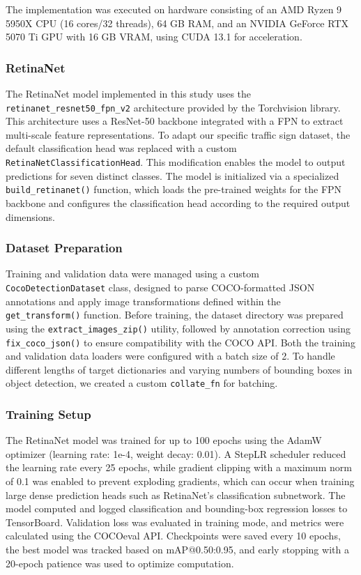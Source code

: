 \documentclass{article}
\begin{document}
The implementation was executed on hardware consisting of an AMD Ryzen 9 5950X CPU (16 cores/32 threads), 64 GB RAM, and an NVIDIA GeForce RTX 5070 Ti GPU with 16 GB VRAM, using CUDA 13.1 for acceleration.

\subsubsection{RetinaNet}
The RetinaNet model implemented in this study uses the \texttt{retinanet\_resnet50\_fpn\_v2} architecture provided by the Torchvision library. This architecture uses a ResNet-50 backbone integrated with a FPN to extract multi-scale feature representations. To adapt our specific traffic sign dataset,  the default classification head was replaced with a custom \texttt{RetinaNetClassificationHead}. This modification enables the model to output predictions for seven distinct classes. The model is initialized via a specialized \texttt{build\_retinanet()} function, which loads the pre-trained weights for the FPN backbone and configures the classification head according to the required output dimensions.

\subsubsection*{Dataset Preparation}
Training and validation data were managed using a custom \texttt{CocoDetectionDataset} class, designed to parse COCO-formatted JSON annotations and apply image transformations defined within the \texttt{get\_transform()} function. 
Before training, the dataset directory was prepared using the \texttt{extract\_images\_zip()} utility, followed by annotation correction using \texttt{fix\_coco\_json()} to ensure compatibility with the COCO API. Both the training and validation data loaders were configured with a batch size of 2. To handle different lengths of target dictionaries and varying numbers of bounding boxes in object detection, we created a custom \texttt{collate\_fn} for batching.

\subsubsection*{Training Setup}
The RetinaNet model was trained for up to 100 epochs using the AdamW optimizer (learning rate: 1e-4, weight decay: 0.01). A StepLR scheduler reduced the learning rate every 25 epochs, while gradient clipping with a maximum norm of 0.1 was enabled to prevent exploding gradients, which can occur when training large dense prediction heads such as RetinaNet's classification subnetwork. The model computed and logged classification and bounding-box regression losses to TensorBoard. Validation loss was evaluated in training mode, and metrics were calculated using the COCOeval API. Checkpoints were saved every 10 epochs, the best model was tracked based on mAP@0.50:0.95, and early stopping with a 20-epoch patience was used to optimize computation.
\end{document}
